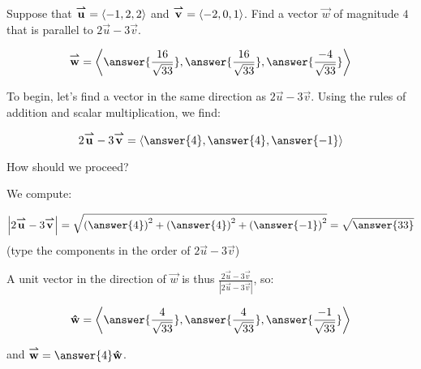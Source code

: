 \documentclass{ximera}
\author{Jim Talamo}
\begin{document}
\begin{exercise}
Suppose that ${\overset{\boldsymbol{\rightharpoonup}}{\mathbf{u}}} = \left\langle -1,2,2\right\rangle$ and ${\overset{\boldsymbol{\rightharpoonup}}{\mathbf{v}}} = \left\langle -2,0,1\right\rangle$.  Find a vector $\vec{w}$ of magnitude $4$ that is parallel to $2\vec{u}-3\vec{v}$.

\[
\vec{w} = \vector{\answer{\frac{16}{\sqrt{33}} }, \answer{ \frac{16}{\sqrt{33}} } , \answer{ \frac{-4}{\sqrt{33}} }}
\]

\begin{hint}
To begin, let's find a vector in the same direction as $2\vec{u}-3\vec{v}$.  Using the rules of addition and scalar multiplication, we find:

\[
2\vec{u}-3\vec{v} = \vector{\answer{4} , \answer{4} , \answer{-1}}
\]

How should we proceed?

\begin{multipleChoice}
\end{multipleChoice}

We compute:

\[
\left|2\vec{u}-3\vec{v}\right| = \sqrt{\left( \answer{4} \right)^2+\left(  \answer{4} \right)^2+\left(  \answer{-1}\right)^2 }  = \sqrt{\answer{33}}
\]
(type the components in the order of $2\vec{u}-3\vec{v}$)

A unit vector in the direction of $\vec{w}$ is thus $\frac{2\vec{u}-3\vec{v}}{\left|2\vec{u}-3\vec{v}\right|}$, so:

\[
\uvec{w} = \vector{\answer{\frac{4}{\sqrt{33}} }, \answer{ \frac{4}{\sqrt{33}} } , \answer{ \frac{-1}{\sqrt{33}} }}
\]

and  $\vec{w} = \answer{4} \uvec{w}$.
\end{hint}

\end{exercise}
\end{document}
